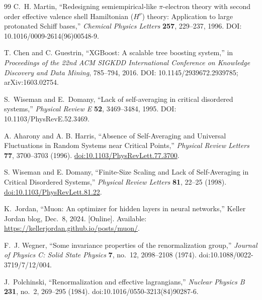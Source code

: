 \documentclass[10pt,twocolumn]{article}
\begin{document}
\begin{thebibliography}{99}
C.~H. Martin,
``Redesigning semiempirical-like $\pi$-electron theory with second order effective valence shell Hamiltonian ($H^\nu$) theory: Application to large protonated Schiff bases,''
\emph{Chemical Physics Letters} \textbf{257}, 229--237, 1996.
DOI: 10.1016/0009-2614(96)00548-9.

T. Chen and C. Guestrin,
``XGBoost: A scalable tree boosting system,''
in \emph{Proceedings of the 22nd ACM SIGKDD International Conference on Knowledge Discovery and Data Mining},
785--794, 2016. DOI: 10.1145/2939672.2939785; arXiv:1603.02754.

S.~Wiseman and E.~Domany,
``Lack of self-averaging in critical disordered systems,''
\emph{Physical Review E} \textbf{52}, 3469--3484, 1995.
DOI: 10.1103/PhysRevE.52.3469.

A. Aharony and A. B. Harris,
``Absence of Self-Averaging and Universal Fluctuations in Random Systems near Critical Points,''
\emph{Physical Review Letters} \textbf{77}, 3700--3703 (1996).
\href{https://doi.org/10.1103/PhysRevLett.77.3700}{doi:10.1103/PhysRevLett.77.3700}.

S. Wiseman and E. Domany,
``Finite-Size Scaling and Lack of Self-Averaging in Critical Disordered Systems,''
\emph{Physical Review Letters} \textbf{81}, 22--25 (1998).
\href{https://doi.org/10.1103/PhysRevLett.81.22}{doi:10.1103/PhysRevLett.81.22}.

K.~Jordan, ``Muon: An optimizer for hidden layers in neural networks,''
Keller Jordan blog, Dec.~8, 2024. [Online]. Available:
\url{https://kellerjordan.github.io/posts/muon/}.

F.~J. Wegner,
``Some invariance properties of the renormalization group,''
\emph{Journal of Physics C: Solid State Physics} \textbf{7}, no.~12,
2098--2108 (1974).
doi:10.1088/0022-3719/7/12/004.

J.~Polchinski,
``Renormalization and effective lagrangians,''
\emph{Nuclear Physics B} \textbf{231}, no.~2,
269--295 (1984).
doi:10.1016/0550-3213(84)90287-6.


\end{thebibliography}
\end{document}
